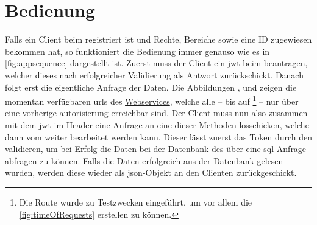 \section{Bedienung}\label{sec:bedienung}

	Falls ein Client beim  registriert ist
	und Rechte, Bereiche sowie eine ID zugewiesen bekommen hat,
	so funktioniert die Bedienung immer genauso wie es in \vref{fig:appsequence} dargestellt ist.
	Zuerst muss der Client ein \gls{jwt} beim  beantragen,
	welcher dieses nach erfolgreicher Validierung als Antwort zurückschickt.
	Danach folgt erst die eigentliche Anfrage der Daten.
	Die Abbildungen ,
	und  zeigen die momentan
	verfügbaren \glspl{url} des \hyperref[subsec:webservice]{Webservices},
	welche alle
	-- bis auf 
	\footnote{Die Route  wurde zu Testzwecken eingeführt,
		um vor allem die \vref{fig:timeOfRequests} erstellen zu können.} --
	nur über eine vorherige \gls{autorisierung} erreichbar sind.
	Der Client muss nun also zusammen mit dem \gls{jwt} im Header eine Anfrage an eine dieser Methoden losschicken,
	welche dann vom  weiter bearbeitet werden kann.
	Dieser lässt zuerst das Token durch den  validieren,
	um bei Erfolg die Daten bei der Datenbank des \lfidSystems{} über eine \gls{sql}-Anfrage abfragen zu können.
	Falls die Daten erfolgreich aus der Datenbank gelesen wurden,
	werden diese wieder als \gls{json}-Objekt an den Clienten zurückgeschickt.
